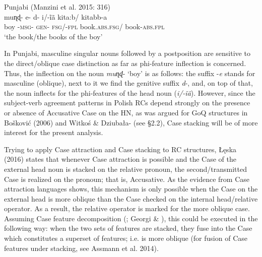 \documentclass[output=paper]{langsci/langscibook}
\begin{document}
\ea%
         Punjabi (Manzini et al. 2015: 316)\label{ex:leska:31}\\
    \gll muɳɖ- e-   d-   i/-\~iã     kita:b/      kitabb-a       \\
         boy   {}-\textsc{msg}{}- \textsc{gen}{}-   \textsc{fsg}/-\textsc{fpl}   book.\textsc{abs.fsg}/   book-\textsc{abs.fpl}\\
    \glt ‘the book/the books of the boy’                
\z

In Punjabi, masculine singular nouns followed by a postposition are sensitive to the direct/oblique case distinction as far as phi-feature inflection is concerned. Thus, the inflection on the noun \textit{muɳɖ}{}- ‘boy’ is as follows: the suffix -\textit{e} stands for masculine (oblique), next to it we find the genitive suffix \textit{d}{}-, and, on top of that, the noun inflects for the phi-features of the head noun (\textit{i/-\~iã}). However, since the subject-verb agreement patterns in Polish RCs depend strongly on the presence or absence of Accusative Case on the HN, as was argued for GoQ structures in Bošković (2006) and Witkoś \& Dziubała-\citealt{Szrejbrowska2016} (see §2.2), Case stacking will be of more interest for the present analysis. 

Trying to apply Case attraction and Case stacking to RC structures, Łęska (2016) states that whenever Case attraction is possible and the Case of the external head noun is stacked on the relative pronoun, the second/transmitted Case is realized on the pronoun; that is, Accusative. As the evidence from Case attraction languages shows, this mechanism is only possible when the Case on the external head is more oblique than the Case checked on the internal head/relative operator. As a result, the relative operator is marked for the more oblique case. Assuming Case feature decomposition (\citealt{Assmann2013}; Georgi \& \citealt{Salzmann2014}), this could be executed in the following way: when the two sets of features are stacked, they fuse into the Case which constitutes a superset of features; i.e. is more oblique (for fusion of Case features under stacking, see Assmann et al. 2014).
\end{document}
